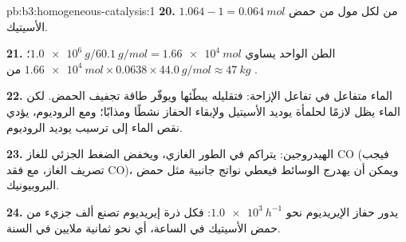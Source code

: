 \begin{solution}{pb:b3:homogeneous-catalysis:1}
\textbf{20.} $1.064 - 1 = \qty{0.064}{mol}$ من  لكل مول من حمض الأسيتيك.

\textbf{21.} الطن الواحد يساوي $\qty{1.0e6}{g}/\qty{60.1}{g/mol} = \qty{1.66e4}{mol}$؛ $\qty{1.66e4}{mol} \times 0.0638 \times \qty{44.0}{g/mol} \approx \qty{47}{kg}$ من .

\textbf{22.} الماء متفاعل في تفاعل الإزاحة: فتقليله يبطّئها ويوفّر طاقة
تجفيف الحمض. لكن الماء يظل لازمًا لحلمأة يوديد الأسيتيل ولإبقاء
الحفاز نشطًا ومذابًا؛ ومع الروديوم، يؤدي نقص الماء إلى ترسيب يوديد
الروديوم.

\textbf{23.} الهيدروجين: يتراكم في الطور الغازي، ويخفض الضغط الجزئي للغاز CO
(فيجب تصريف الغاز، مع فقد CO)، ويمكن أن يهدرج الوسائط فيعطي
نواتج جانبية مثل حمض البروبيونيك.

\textbf{24.} يدور حفاز الإيريديوم نحو $\qty{1.0e3}{h^{-1}}$: فكل ذرة إيريديوم تصنع
ألف جزيء من حمض الأسيتيك في الساعة، أي نحو ثمانية ملايين في السنة.
\end{solution}

